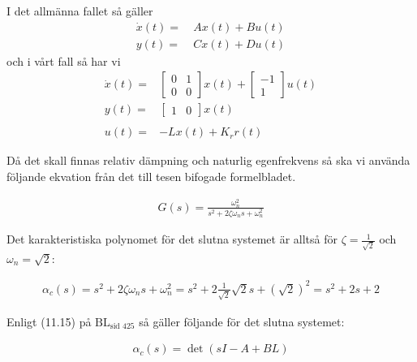 \documentclass[a4paper]{article}
\newcommand{\bl}[1]{$\text{BL}_{\text{#1}}$}  %
\begin{document}
I det allmänna fallet så gäller
\begin{align*}
  \dot{x}(t) =~& Ax(t) + Bu(t) \\
  y(t) =~& Cx(t) + Du(t)
\end{align*}
och i vårt fall så har vi
\begin{align*}
  \dot{x}(t) =& \begin{bmatrix}0 & 1 \\ 0 & 0\end{bmatrix} x(t) + \begin{bmatrix}-1 \\ 1\end{bmatrix} u(t) \\
  y(t) =& \begin{bmatrix}1 & 0\end{bmatrix} x(t)\\\\
  u(t) =& -Lx(t) + K_r r(t)
\end{align*}


Då det skall finnas relativ dämpning och naturlig egenfrekvens så ska vi använda följande ekvation från det till tesen bifogade formelbladet.

\begin{align*}
  G(s) = \frac{\omega_n ^2}{s^2 + 2\zeta \omega_n s + \omega_n^2}
\end{align*}

Det karakteristiska polynomet för det slutna systemet är alltså för $\zeta = \frac{1}{\sqrt{2}}$ och $\omega_n = \sqrt{2}$:

\begin{align*}
  \alpha_c(s) = s^2 + 2\zeta \omega_n s + \omega_n^2 = s^2 + 2\frac{1}{\sqrt{2}} \sqrt{2} s + (\sqrt{2})^2 = s^2 + 2s + 2
\end{align*}

Enligt (11.15) på \bl{sid 425} så gäller följande för det slutna systemet:

\begin{align*}
  \alpha_c(s) = \det(sI - A + BL)
\end{align*}
\end{document}
